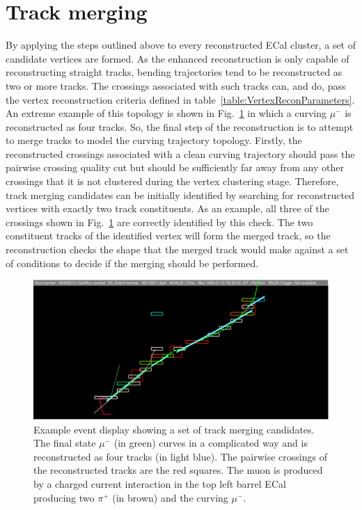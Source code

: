 \section{Track merging}
\label{subsec:TrackMerging}
By applying the steps outlined above to every reconstructed ECal cluster, a set of candidate vertices are formed.  As the enhanced reconstruction is only capable of reconstructing straight tracks, bending trajectories tend to be reconstructed as two or more tracks.  The crossings associated with such tracks can, and do, pass the vertex reconstruction criteria defined in table~\ref{table:VertexReconParameters}.  An extreme example of this topology is shown in Fig.~\ref{fig:TrackMergingEventDisplay} in which a curving $\mu^-$ is reconstructed as four tracks.  So, the final step of the reconstruction is to attempt to merge tracks to model the curving trajectory topology.  Firstly, the reconstructed crossings associated with a clean curving trajectory should pass the pairwise crossing quality cut but should be sufficiently far away from any other crossings that it is not clustered during the vertex clustering stage.  Therefore, track merging candidates can be initially identified by searching for reconstructed vertices with exactly two track constituents.  As an example, all three of the crossings shown in Fig.~\ref{fig:TrackMergingEventDisplay} are correctly identified by this check.  The two constituent tracks of the identified vertex will form the merged track, so the reconstruction checks the shape that the merged track would make against a set of conditions to decide if the merging should be performed. 
\begin{figure}
  \centering
  \includegraphics[width=12cm]{images/selection/vertex_recon/track_merging_event_display.eps}
  \caption{Example event display showing a set of track merging candidates.  The final state $\mu^-$ (in green) curves in a complicated way and is reconstructed as four tracks (in light blue).  The pairwise crossings of the reconstructed tracks are the red squares.  The muon is produced by a charged current interaction in the top left barrel ECal producing two $\pi^+$ (in brown) and the curving $\mu^-$. }
  \label{fig:TrackMergingEventDisplay}
\end{figure}
